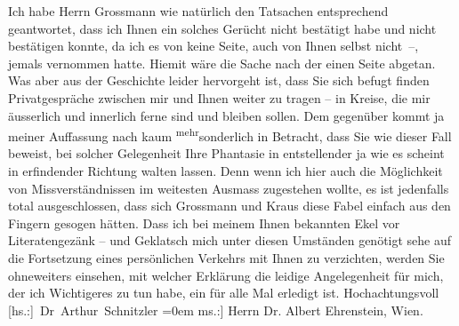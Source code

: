 \begin{ledgroupsized}[t]{13cm}
           \pstart
           Ich habe Herrn Grossmann wie natürlich den
               Tatsachen entsprechend geantwortet, dass ich Ihnen ein solches Gerücht nicht
               bestätigt habe und nicht bestätigen konnte, da ich es von keine Seite, auch von Ihnen
               selbst nicht –, jemals vernommen hatte. Hiemit wäre die Sache nach der einen Seite
               abgetan. Was aber aus der Geschichte leider hervorgeht ist, dass Sie sich befugt
               finden Privatge{\pb}spräche zwischen mir und Ihnen weiter zu tragen –
               in Kreise, die mir äusserlich und innerlich ferne sind und bleiben sollen. Dem
               gegenüber kommt ja meine\introOben{}r\introOben{} Auffassung \introOben{}nach\introOben{} kaum \substVorne{}\textsuperscript{mehr}\substDazwischen{}sonderlich\substHinten{} in Betracht, dass Sie wie dieser Fall beweist, bei solcher Gelegenheit Ihre
               Phantasie in entstellender ja wie es scheint in erfindender Richtung walten lassen.
               Denn wenn ich hier auch die Möglichkeit von Missverständnissen im weitesten Ausmass
               zugestehen wollte, es ist jedenfalls total ausgeschlossen, dass sich Grossmann und Kraus diese Fabel einfach aus den Fingern gesogen hätten. Dass ich bei
               meinem Ihnen bekannten Ekel vor Literatengezänk – und Geklatsch mich unter diesen
               Umständen genötigt sehe auf die Fortsetzung eines persönlichen Verkehrs mit Ihnen zu
               verzichten, werden Sie ohneweiters einsehen, mit welcher Erklärung die leidige
               Angelegenheit für mich, der ich Wichtigeres zu tun habe, ein für alle Mal erledigt
               ist.\pend
           \pstart
           Hochachtungsvoll{\\[\baselineskip]}\spacefill\mbox{{[}hs.:{]} Dr Arthur Schnitzler}\pend
           \leftskip=0em{}\pstart
           \noindent{}{[}ms.:{]} Herrn Dr. Albert Ehrenstein, Wien.\pend
           
         
         \endnumbering{}\end{ledgroupsized}  \newcommand{\dateiname}{L02008}\newcommand{\titel}{Arthur Schnitzler an Albert Ehrenstein, 9. 2. 1911}\newcommand{\editorInnen}{Martin Anton Müller und Gerd-Hermann Susen}
      